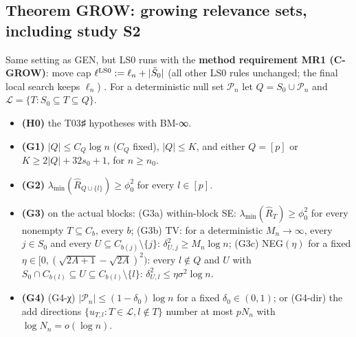 \subsection{Theorem GROW: growing relevance sets, including study S2}\label{sec:grow}
Same setting as GEN, but LS0 runs with the \textbf{method requirement MR1 (C-GROW)}: move cap $\ell^{\rm LS0}:=\ell_n+|\tilde{S}_0|$ (all other LS0 rules unchanged; the final local search keeps $\ell_n$) . For a deterministic null set $\mathcal P_n$ let $Q=S_0\cup\mathcal P_n$ and $\mathcal L=\{T:S_0\subseteq T\subseteq Q\}$.
\begin{itemize}
\item \textbf{(H0)} the T03♯ hypotheses with BM-∞.
\item \textbf{(G1)} $|Q|\le C_Q\log n$ ($C_Q$ fixed), $|Q|\le K$, and either $Q=[p]$ or $K\ge2|Q|+32s_0+1$, for $n\ge n_0$.
\item \textbf{(G2)} $\lambda_{\min}(\hat{R}_{Q\cup\{l\}})\ge\phi_0^2$ for every $l\in[p]$.
\item \textbf{(G3)} on the actual blocks: (G3a) within-block SE: $\lambda_{\min}(\hat{R}_T)\ge\phi_0^2$ for every nonempty $T\subseteq C_b$, every $b$; (G3b) TV: for a deterministic $M_n\to\infty$, every $j\in S_0$ and every $U\subseteq C_{b(j)}\setminus\{j\}$: $\delta^2_{U,j}\ge M_n\log n$; (G3c) NEG$(\eta)$ for a fixed $\eta\in[0,(\sqrt{2A+1}-\sqrt{2A})^2)$: every $l\notin Q$ and $U$ with $S_0\cap C_{b(l)}\subseteq U\subseteq C_{b(l)}\setminus\{l\}$: $\delta^2_{U,l}\le\eta\sigma^2\log n$.
\item \textbf{(G4)} (G4-χ) $|\mathcal P_n|\le(1-\delta_0)\log n$ for a fixed $\delta_0\in(0,1)$; or (G4-dir) the add directions $\{u_{T,l}:T\in\mathcal L,l\notin T\}$ number at most $pN_n$ with $\log N_n=o(\log n)$.
\end{itemize}
